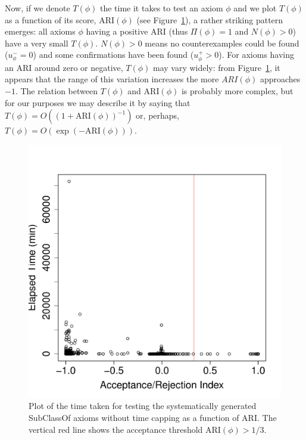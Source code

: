 \documentclass{sig-alternate}
\begin{document}
Now, if we denote $T(\phi)$ the time it takes to test an axiom $\phi$ and we plot
$T(\phi)$ as a function of its score, $\mathrm{ARI}(\phi)$ (see Figure~\ref{fig:time-ARI}),
a rather striking pattern emerges: all axioms $\phi$ having a positive ARI
(thus $\Pi(\phi) = 1$ and $N(\phi) > 0$) have a very small $T(\phi)$.
$N(\phi) > 0$ means no counterexamples could be found ($u^-_\phi = 0$)
and some confirmations have been found ($u^+_\phi > 0$).
For axioms having an ARI around zero or negative, $T(\phi)$ may vary widely:
from Figure~\ref{fig:time-ARI}, it appears that the range of this variation
increases the more $ARI(\phi)$ approaches $-1$.
The relation between $T(\phi)$ and $\mathrm{ARI}(\phi)$ is probably more complex,
but for our purposes we may describe it by saying that
$T(\phi) = O\left((1 + \mathrm{ARI}(\phi))^{-1}\right)$ or, perhaps,
$T(\phi) = O\left(\exp(-\mathrm{ARI}(\phi))\right)$.

\begin{figure}[t]
\begin{center}
  \includegraphics[height=\plotheight]{time-ARI}
\end{center}
\caption{Plot of the time taken for testing the systematically generated
  \textsf{SubClassOf} axioms without time capping as a function of ARI.
  The vertical red line shows the acceptance threshold $\mathrm{ARI}(\phi)>1/3$.}
\label{fig:time-ARI}
\end{figure}
\end{document}
